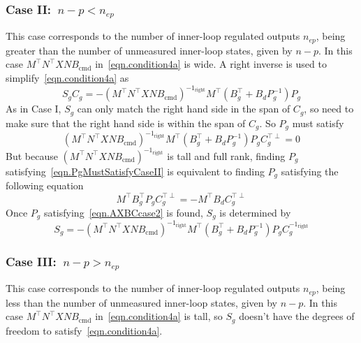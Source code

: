 \subsubsection{Case II:~$n-p<n_{ep}$}

This case corresponds to the number of inner-loop regulated outputs $n_{ep}$, being greater than the number of unmeasured inner-loop states, given by $n-p$.
In this case $M^{\top}N^{\top}XNB_{\text{cmd}}$ in\ \eqref{eqn.condition4a} is wide.
A right inverse is used to simplify\ \eqref{eqn.condition4a} as
\begin{equation*}
  S_{g}C_{g}
  =
  -(M^{\top}N^{\top}XNB_{\text{cmd}})^{-1_{\text{right}}}M^{\top}(B_{g}^{\top}+B_{d}P_{g}^{-1})P_{g}
\end{equation*}
As in Case I, $S_{g}$ can only match the right hand side in the span of $C_{g}$, so need to make sure that the right hand side is within the span of $C_{g}$.
So $P_{g}$ must satisfy
\begin{equation}
  \label{eqn.PgMustSatisfyCaseII}
  (M^{\top}N^{\top}XNB_{\text{cmd}})^{-1_{\text{right}}}M^{\top}(B_{g}^{\top}+B_{d}P_{g}^{-1})P_{g}C_{g}^{\top\perp} = 0
\end{equation}
But because $(M^{\top}N^{\top}XNB_{\text{cmd}})^{-1_{\text{right}}}$ is tall and full rank, finding $P_{g}$ satisfying\ \eqref{eqn.PgMustSatisfyCaseII} is equivalent to finding $P_{g}$ satisfying the following equation
\begin{equation}
  \label{eqn.AXBCcase2}
  M^{\top}B_{g}^{\top}P_{g}C_{g}^{\top\perp} = - M^{\top}B_{d}C_{g}^{\top\perp}
\end{equation}
Once $P_{g}$ satisfying\ \eqref{eqn.AXBCcase2} is found, $S_{g}$ is determined by
\begin{equation}
  \label{eqn.SgCaseII}
  S_{g} = - (M^{\top}N^{\top}XNB_{\text{cmd}})^{-1_{\text{right}}}M^{\top}(B_{g}^{\top}+B_{d}P_{g}^{-1})P_{g}C_{g}^{-1_{\text{right}}}
\end{equation}

\subsubsection{Case III:~$n-p>n_{ep}$}

This case corresponds to the number of inner-loop regulated outputs $n_{ep}$, being less than the number of unmeasured inner-loop states, given by $n-p$.
In this case $M^{\top}N^{\top}XNB_{\text{cmd}}$ in\ \eqref{eqn.condition4a} is tall, so $S_{g}$ doesn't have the degrees of freedom to satisfy\ \eqref{eqn.condition4a}.

